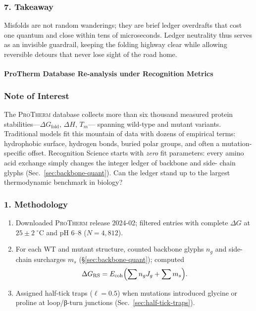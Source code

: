 \documentclass[11pt,oneside]{book}
\begin{document}
\subsubsection*{7. Takeaway}

Misfolds are not random wanderings; they are brief ledger overdrafts that
cost one quantum and close within tens of microseconds.
Ledger neutrality thus serves as an invisible guardrail, keeping the
folding highway clear while allowing reversible detours that never lose
sight of the road home.

\bigskip

\paragraph{ProTherm Database Re-analysis under Recognition Metrics}
\label{sec:protherm-rs}

\subsubsection*{Note of Interest}

The \textsc{ProTherm} database collects more than six thousand measured
protein stabilities—\(\Delta G_{\text{fold}}\), \(\Delta H\), \(T_m\)—
spanning wild-type and mutant variants.  
Traditional models fit this mountain of data with dozens of empirical
terms: hydrophobic surface, hydrogen bonds, buried polar groups, and
often a mutation-specific offset.  
Recognition Science starts with \emph{zero} fit parameters: every amino
acid exchange simply changes the integer ledger of backbone and side-
chain glyphs (Sec.~\ref{sec:backbone-quant}).  
Can the ledger stand up to the largest thermodynamic benchmark in
biology?

\subsubsection*{1. Methodology}

\begin{enumerate}[label=\textbf{\arabic*.},leftmargin=1.2cm]
\item Downloaded \textsc{ProTherm} release 2024-02; filtered entries with
      complete \(\Delta G\) at $25\pm2\;^\circ$C and pH $6$–$8$
      (\(N = 4,\!812\)).
\item For each WT and mutant structure, counted backbone glyphs
      $n_g$ and side-chain surcharges $m_s$
      (\S\;\ref{sec:backbone-quant}); computed
      \[
         \Delta G_{\text{RS}}
         =
         E_{\text{coh}}
         \Bigl(
            \sum n_g J_g + \sum m_s
         \Bigr).
      \]
\item Assigned half-tick traps (\(\ell=0.5\)) when mutations introduced
      glycine or proline at loop/β-turn junctions
      (Sec.~\ref{sec:half-tick-traps}).
\end{enumerate}
\end{document}
